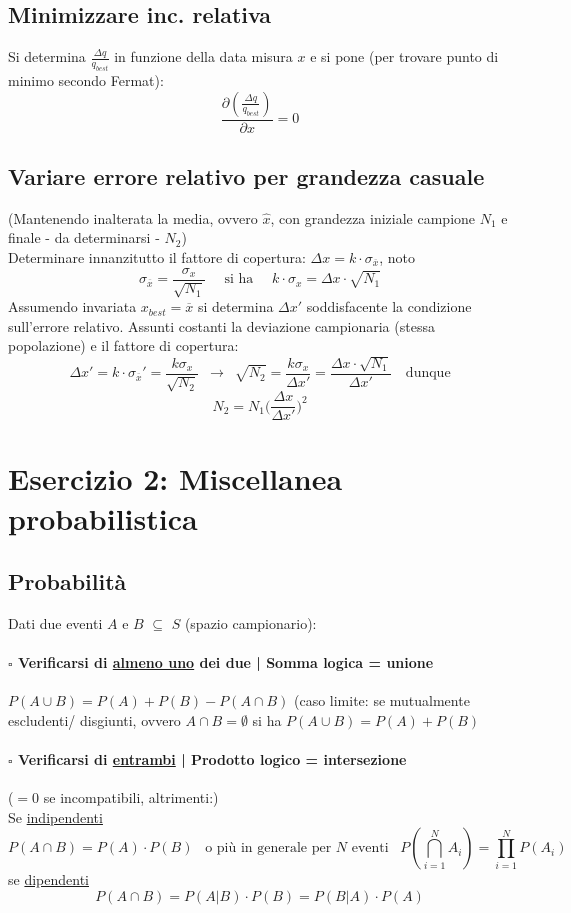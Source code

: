 \documentclass[11pt]{article}
\begin{document}
\subsection{Minimizzare inc. relativa}
Si determina $\frac{\Delta q}{q_{best}}$ in funzione della data misura $x$ e si pone (per trovare punto di minimo secondo Fermat):
\[\frac{\partial (\frac{\Delta q}{q_{best}})}{\partial x} = 0\]

\subsection{Variare errore relativo per grandezza casuale}
(Mantenendo inalterata la media, ovvero $\hat{x}$, con grandezza iniziale campione $N_1$ e finale - da determinarsi - $N_2$)
\\Determinare innanzitutto il fattore di copertura: $\Delta x = k \cdot \sigma_{\overline{x}}$, noto 
\[\sigma_{\overline{x}} = \frac{\sigma_x}{\sqrt{N_1}} \quad \textrm{  si ha  } \quad k \cdot \sigma_x = \Delta x \cdot \sqrt{N_1}\]
Assumendo invariata $x_{best} = \overline{x}$ si determina $\Delta x '$ soddisfacente la condizione sull'errore relativo. Assunti costanti la deviazione campionaria (stessa popolazione) e il fattore di copertura:
\[\Delta x' = k \cdot \sigma_{\overline{x}}' = \frac{k \sigma_x}{\sqrt{N_2}} \enspace \rightarrow \enspace \sqrt{N_2} = \frac{k \sigma_x}{\Delta x'} = \frac{\Delta x \cdot \sqrt{N_1}}{\Delta x'} \quad \textrm{dunque}\]
\[N_2 = N_1 \bigg( \frac{\Delta x}{\Delta x'} \bigg)^2\]

\section{Esercizio 2: Miscellanea probabilistica}

\subsection{Probabilità}
Dati due eventi $A$ e $B$ $\subseteq$ $S$ (spazio campionario):
\paragraph{$\square$ Verificarsi di \underline{almeno uno} dei due | Somma logica = unione} $P(A \cup B) = P(A) + P(B) - P(A \cap B)$ (caso limite: se mutualmente escludenti/ disgiunti, ovvero $A \cap B = \emptyset$ si ha $P(A \cup B) = P(A) + P(B)$
\paragraph{$\square$ Verificarsi di \underline{entrambi} | Prodotto logico = intersezione}($=0$ se incompatibili, altrimenti:)
\\Se \underline{indipendenti} 
\[P(A \cap B) = P(A) \cdot P(B) \enspace \textrm{ o più in generale per $N$ eventi }\enspace P(\bigcap \limits_{i=1}^{N} A_i) = \prod \limits_{i=1}^{N} P(A_i)\]
se \underline{dipendenti} 
\[P(A \cap B) = P(A | B) \cdot P(B) = P(B | A) \cdot P(A)\]
\end{document}
